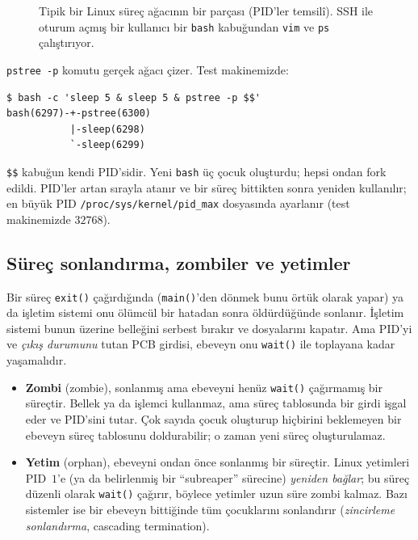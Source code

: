 \documentclass[11pt,a4paper]{article}
\newcommand{\term}[1]{\textbf{\color{mintdeep}#1}}
\newcommand{\cmd}[1]{\texttt{#1}}
\begin{document}
\begin{figure}[H]
\centering
{}
\caption{Tipik bir Linux süreç ağacının bir parçası (PID'ler temsilî). SSH ile oturum açmış bir kullanıcı bir \cmd{bash} kabuğundan \cmd{vim} ve \cmd{ps} çalıştırıyor.}
\end{figure}

\cmd{pstree -p} komutu gerçek ağacı çizer. Test makinemizde:
\begin{lstlisting}[style=term]
$ bash -c 'sleep 5 & sleep 5 & pstree -p $$'
bash(6297)-+-pstree(6300)
           |-sleep(6298)
           `-sleep(6299)
\end{lstlisting}
\verb|$$| kabuğun kendi PID'sidir. Yeni \cmd{bash} üç çocuk oluşturdu; hepsi ondan fork edildi. PID'ler artan sırayla atanır ve bir süreç bittikten sonra yeniden kullanılır; en büyük PID \nolinkurl{/proc/sys/kernel/pid_max} dosyasında ayarlanır (test makinemizde $32768$).

\subsection{Süreç sonlandırma, zombiler ve yetimler}
\label{sec:zombie}

Bir süreç \cmd{exit()} çağırdığında (\cmd{main()}'den dönmek bunu örtük olarak yapar) ya da işletim sistemi onu ölümcül bir hatadan sonra öldürdüğünde sonlanır. İşletim sistemi bunun üzerine belleğini serbest bırakır ve dosyalarını kapatır. Ama PID'yi ve \emph{çıkış durumunu} tutan PCB girdisi, ebeveyn onu \cmd{wait()} ile toplayana kadar yaşamalıdır.

\begin{itemize}
  \item \term{Zombi} (zombie), sonlanmış ama ebeveyni henüz \cmd{wait()} çağırmamış bir süreçtir. Bellek ya da işlemci kullanmaz, ama süreç tablosunda bir girdi işgal eder ve PID'sini tutar. Çok sayıda çocuk oluşturup hiçbirini beklemeyen bir ebeveyn süreç tablosunu doldurabilir; o zaman yeni süreç oluşturulamaz.
  \item \term{Yetim} (orphan), ebeveyni ondan önce sonlanmış bir süreçtir. Linux yetimleri PID~$1$'e (ya da belirlenmiş bir ``subreaper'' sürecine) \emph{yeniden bağlar}; bu süreç düzenli olarak \cmd{wait()} çağırır, böylece yetimler uzun süre zombi kalmaz. Bazı sistemler ise bir ebeveyn bittiğinde tüm çocuklarını sonlandırır (\emph{zincirleme sonlandırma}, cascading termination).
\end{itemize}
\end{document}
